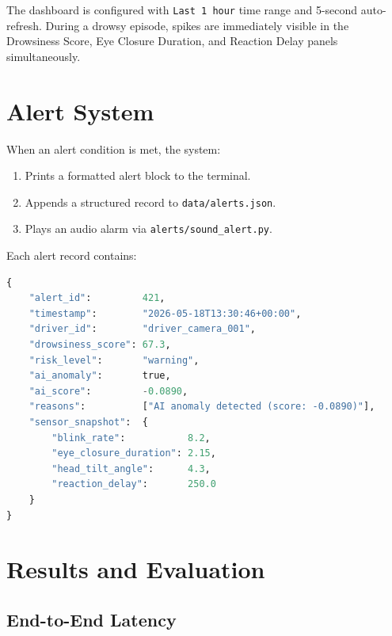 \documentclass[12pt, a4paper]{article}
\begin{document}
The dashboard is configured with \texttt{Last 1 hour} time range and 5-second
auto-refresh. During a drowsy episode, spikes are immediately visible in the
Drowsiness Score, Eye Closure Duration, and Reaction Delay panels simultaneously.

\section{Alert System}
\label{sec:alerts}

When an alert condition is met, the system:

\begin{enumerate}
    \item Prints a formatted alert block to the terminal.
    \item Appends a structured record to \texttt{data/alerts.json}.
    \item Plays an audio alarm via \texttt{alerts/sound\_alert.py}.
\end{enumerate}

Each alert record contains:

\begin{lstlisting}[language=Python, caption={Alert record structure}]
{
    "alert_id":         421,
    "timestamp":        "2026-05-18T13:30:46+00:00",
    "driver_id":        "driver_camera_001",
    "drowsiness_score": 67.3,
    "risk_level":       "warning",
    "ai_anomaly":       true,
    "ai_score":         -0.0890,
    "reasons":          ["AI anomaly detected (score: -0.0890)"],
    "sensor_snapshot":  {
        "blink_rate":           8.2,
        "eye_closure_duration": 2.15,
        "head_tilt_angle":      4.3,
        "reaction_delay":       250.0
    }
}
\end{lstlisting}
\newpage

\section{Results and Evaluation}
\label{sec:results}

\subsection{End-to-End Latency}
\end{document}
